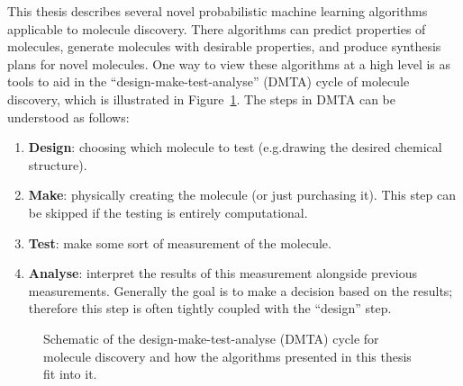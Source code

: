This thesis describes several novel probabilistic machine learning algorithms 
applicable to molecule discovery.
There algorithms can predict properties of molecules,
generate molecules with desirable properties,
and produce synthesis plans for novel molecules.
One way to view these algorithms at a high level is as tools to aid in the
``design-make-test-analyse'' (DMTA) cycle of molecule discovery,
which is illustrated in Figure~\ref{fig:dmta-schematic}.
The steps in DMTA can be understood as follows:
\begin{enumerate}
    \item \textbf{Design}:
        choosing which molecule to test (e.g.\@ drawing the desired chemical structure).
    \item \textbf{Make}:
        physically creating the molecule (or just purchasing it).
        This step can be skipped if the testing is entirely computational.
    \item \textbf{Test}: make some sort of measurement of the molecule.
    \item \textbf{Analyse}: interpret the results of this measurement alongside previous measurements.
        Generally the goal is to make a decision based on the results;
        therefore this step is often tightly coupled with the ``design'' step.
\end{enumerate}

\begin{figure}[t]
    
    \caption[Schematic of the design-make-test-analyse (DMTA) cycle]{
        Schematic of the design-make-test-analyse (DMTA) cycle for molecule discovery
        and how the algorithms presented in this thesis fit into it.
    } 
    \label{fig:dmta-schematic}
\end{figure}

